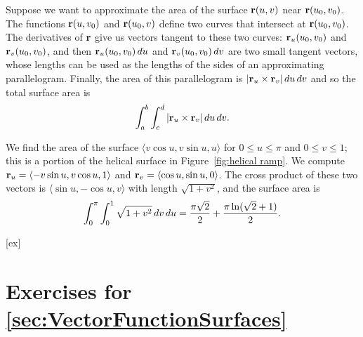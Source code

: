 Suppose we want to approximate the area of the surface ${\bf r}(u,v)$
near ${\bf r}(u_0,v_0)$. The functions ${\bf r}(u,v_0)$ and ${\bf
  r}(u_0,v)$ define two curves that intersect at ${\bf
  r}(u_0,v_0)$. The derivatives of $\bf r$ give us vectors tangent to
these two curves: ${\bf r}_u(u_0,v_0)$ and ${\bf r}_v(u_0,v_0)$, and
then ${\bf r}_u(u_0,v_0)\,du$ and ${\bf r}_v(u_0,v_0)\,dv$
are two small tangent vectors, whose lengths can be used as the
lengths of the sides of an approximating parallelogram. Finally, the
area of this parallelogram is $|{\bf r}_u\times{\bf r}_v|\,du\,dv$ and
so the total surface area is
$$\int_a^b\int_c^d |{\bf r}_u\times{\bf r}_v|\,du\,dv.$$

\begin{example}{}{}
We find the area of the surface $\langle v\cos u,v\sin
u,u\rangle$ for $0\le u \le \pi$ and  $0\le v\le 1$; this is a portion
of the helical surface in Figure~\ref{fig:helical ramp}.
We compute ${\bf r}_u = \langle -v\sin u,v\cos u,1\rangle$
and ${\bf r}_v = \langle \cos u,\sin u,0\rangle$.
The cross product of these two vectors is $\langle \sin u,-\cos
u,v\rangle$ with length $\sqrt{1+v^2}$, and the surface area is
$$\int_0^\pi\int_0^1 \sqrt{1+v^2}\,dv\,du={\pi\sqrt2\over2}+
{\pi\ln(\sqrt2+1)\over 2}.$$
\end{example}


[ex]
\section*{Exercises for \ref{sec:VectorFunctionSurfaces}}


